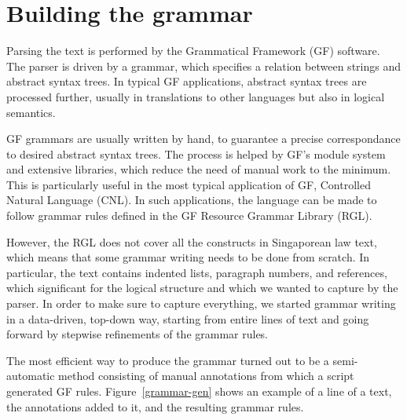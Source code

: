 \documentclass{IOS-Book-Article}
\begin{document}
\section{Building the grammar}

Parsing the text is performed by the Grammatical Framework (GF) software.
The parser is driven by a grammar, which specifies a relation between strings and abstract syntax trees.
In typical GF applications, abstract syntax trees are processed further, usually in translations to other languages but also in logical semantics. 

GF grammars are usually written by hand, to guarantee a precise correspondance to desired abstract syntax trees.
The process is helped by GF's module system and extensive libraries, which reduce the need of manual work to the minimum.
This is particularly useful in the most typical application of GF, Controlled Natural Language (CNL).
In such applications, the language can be made to follow grammar rules defined in the GF Resource Grammar Library (RGL).

However, the RGL does not cover all the constructs in Singaporean law text, which means that some grammar writing needs to be done from scratch.
In particular, the text contains indented lists, paragraph numbers, and references, which significant for the logical structure and which we wanted to capture by the parser.
In order to make sure to capture everything, we started grammar writing in a data-driven, top-down way, starting from entire lines of text and going forward by stepwise refinements of the grammar rules.

The most efficient way to produce the grammar turned out to be a semi-automatic method consisting of manual annotations from which a script generated GF rules.
Figure~\ref{grammar-gen} shows an example of a line of a text, the annotations added to it, and the resulting grammar rules.
\end{document}
